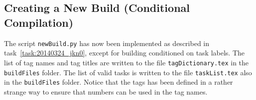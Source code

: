 \subsection{Creating a New Build (Conditional Compilation)}
\label{task:20140404_jkn0}
The script {\tt newBuild.py} has now been implemented as described in task~\ref{task:20140324_jkn0}, except for building conditioned on task labels. The list of tag names and tag titles are written to the file {\tt tagDictionary.tex} in the {\tt buildFiles} folder. The list of valid tasks is written to the file {\tt taskList.tex} also in the {\tt buildFiles} folder. Notice that the tags has been defined in a rather strange way to ensure that numbers can be used in the tag names.
